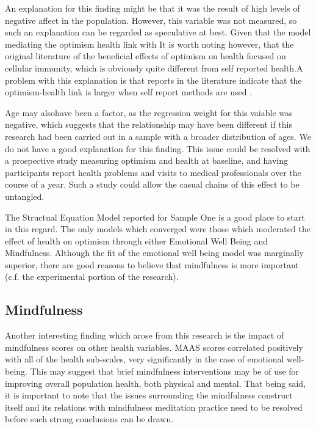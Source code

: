 \documentclass{article}
\begin{document}
An explanation for this finding might be that it was the result
of high levels of negative affect in the population.  However, this
variable was not measured, so such an explanation can be regarded
as speculative at best. Given that the model mediating the optimism health link with   It is worth noting however, that the original
literature of the beneficial effects of optimism on health focused
on cellular immunity, which is obviously quite different from self
reported health.A problem with this explanation is that reports in the
literature indicate that the optimism-health link is larger when self
report methods are used \cite{rasmussen2009optimism}.  

Age may alsohave been a factor, as the regression weight for this vaiable was negative, which suggests that the relationship may have been different
if this research had been carried out in a sample with a broader distribution of ages.  We do not have a good explanation for this finding.
This issue could be resolved with a prospective study
measuring optimism and health at baseline, and having participants
report health problems and visits to medical professionals over the
course of a year.  Such a study could allow the casual chains of this
effect to be untangled.

The Structual Equation Model reported for Sample One is a good place to start in this regard.
The only models which converged were those which moderated the effect of health on optimism 
through either Emotional Well Being and Mindfulness. Although the fit of the emotional well being 
model was marginally superior, there are good reasons to believe that mindfulness is more 
important (c.f. the experimental portion of the research). 


\subsection{Mindfulness}
\label{sec:mindfulness}

Another interesting finding which arose from this research is the
impact of mindfulness scores on other health variables.  MAAS scores
correlated positively with all of the health sub-scales, very significantly
in the case of emotional well-being.  This may suggest that brief mindfulness
interventions may be of use for improving overall population health,
both physical and mental.  That being said, it is important to note  that the issues surrounding the mindfulness construct
itself and its relations with mindfulness meditation practice need
to be resolved before such strong conclusions can be drawn.
\end{document}
